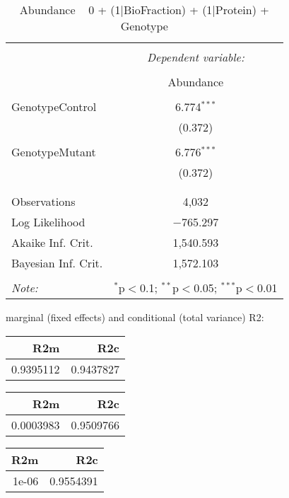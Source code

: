 \documentclass[11pt]{report}
\begin{document}
\begin{table}[!htbp] \centering 
  \caption{Abundance ~ 0 + (1|BioFraction) + (1|Protein) + Genotype} 
  \label{} 
\begin{tabular}{@{\extracolsep{5pt}}lc} 
\\[-1.8ex]\hline 
\hline \\[-1.8ex] 
 & \multicolumn{1}{c}{\textit{Dependent variable:}} \\ 
\cline{2-2} 
\\[-1.8ex] & Abundance \\ 
\hline \\[-1.8ex] 
 GenotypeControl & 6.774$^{***}$ \\ 
  & (0.372) \\ 
  & \\ 
 GenotypeMutant & 6.776$^{***}$ \\ 
  & (0.372) \\ 
  & \\ 
\hline \\[-1.8ex] 
Observations & 4,032 \\ 
Log Likelihood & $-$765.297 \\ 
Akaike Inf. Crit. & 1,540.593 \\ 
Bayesian Inf. Crit. & 1,572.103 \\ 
\hline 
\hline \\[-1.8ex] 
\textit{Note:}  & \multicolumn{1}{r}{$^{*}$p$<$0.1; $^{**}$p$<$0.05; $^{***}$p$<$0.01} \\ 
\end{tabular} 
\end{table} 
marginal (fixed effects) and conditional (total variance) R2:

\begin{tabular}{r|r}
\hline
R2m & R2c\\
\hline
0.9395112 & 0.9437827\\
\hline
\end{tabular}

\begin{tabular}{r|r}
\hline
R2m & R2c\\
\hline
0.0003983 & 0.9509766\\
\hline
\end{tabular}

\begin{tabular}{r|r}
\hline
R2m & R2c\\
\hline
1e-06 & 0.9554391\\
\hline
\end{tabular}
\end{document}
